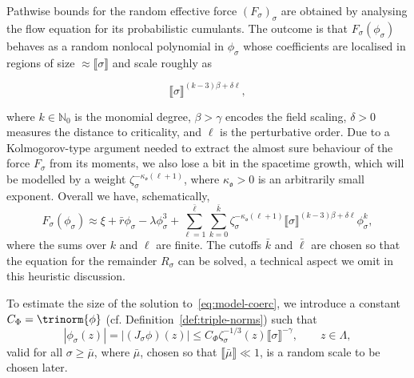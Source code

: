 \documentclass{article}
\numberwithin{equation}{section}
\theoremstyle{plain}
\theoremstyle{definition}
\begin{document}
Pathwise bounds for the random effective force $(F_{\sigma})_{\sigma}$ are
obtained by analysing the flow equation for its probabilistic cumulants. The
outcome is that $F_{\sigma} (\phi_{\sigma})$ behaves as a random nonlocal
polynomial in $\phi_{\sigma}$ whose coefficients are localised in regions of
size $\approx \llbracket \sigma \rrbracket$ and scale roughly as

\[ \llbracket \sigma \rrbracket^{(k - 3) \beta + \delta \ell}, \]

where $k \in \mathbb{N}_0$ is the monomial degree, $\beta > \gamma$ encodes
the field scaling, $\delta > 0$ measures the distance to criticality, and
$\ell$ is the perturbative order. Due to a Kolmogorov-type argument needed
to extract the almost sure behaviour of the force $F_{\sigma}$ from its
moments, we also lose a bit in the spacetime growth, which will be modelled
by a weight $\zeta_{\sigma}^{- \kappa_{\mathfrak{o}} (\ell + 1)}$, where
$\kappa_{\mathfrak{o}} > 0$ is an arbitrarily small exponent. Overall we have,
schematically,
\begin{equation}
  F_{\sigma} (\phi_{\sigma}) \approx \xi + \bar{r} \phi_{\sigma}  - \lambda
  \phi_{\sigma}^3 + \sum_{\ell = 1}^{\bar{\ell}} \sum_{k = 0}^{\bar{k}}
  \zeta_{\sigma}^{- \kappa_{\mathfrak{o}} (\ell + 1)}  \llbracket \sigma
  \rrbracket^{(k - 3) \beta + \delta \ell} \phi_{\sigma}^k,
  \label{eq:model-post}
\end{equation}
where the sums over $k$ and $\ell$ are finite. The cutoffs $\bar{k}$ and
$\bar{\ell}$ are chosen so that the equation for the remainder $R_{\sigma}$
can be solved, a technical aspect we omit in this heuristic discussion.

To estimate the size of the solution to~\eqref{eq:model-coerc}, we introduce
a constant $C_{\Phi} = \trinorm{ \phi }$ (cf.
Definition~\ref{def:triple-norms}) such that
\begin{equation}
  | \phi_{\sigma} (z) | = | (J_{\sigma} \phi) (z) | \leqslant C_{\Phi}
  \zeta_{\sigma}^{- 1 / 3} (z)  \llbracket \sigma \rrbracket^{- \gamma},
  \qquad z \in \Lambda, \label{eq:trivial-est}
\end{equation}
valid for all $\sigma \geqslant \bar{\mu}$, where $\bar{\mu}$, chosen so that
$\llbracket \bar{\mu} \rrbracket \ll 1$, is a random scale to be chosen later.
\end{document}

